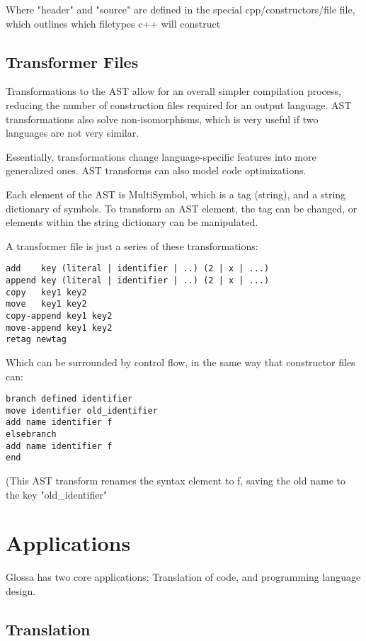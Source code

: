 \documentclass{article}
\begin{document}
Where "header" and "source" are defined in the special cpp/constructors/file file, which outlines which filetypes c++ will construct

\subsection{Transformer Files}

Transformations to the AST allow for an overall simpler compilation process, reducing the number of construction files required for an output language. 
AST transformations also solve non-isomorphisms, which is very useful if two languages are not very similar.

Essentially, transformations change language-specific features into more generalized ones. 
AST transforms can also model code optimizations.

Each element of the AST is MultiSymbol, which is a tag (string), and a string dictionary of symbols.
To transform an AST element, the tag can be changed, or elements within the string dictionary can be manipulated.

A transformer file is just a series of these transformations:
\begin{verbatim}
add    key (literal | identifier | ..) (2 | x | ...)
append key (literal | identifier | ..) (2 | x | ...)
copy   key1 key2
move   key1 key2
copy-append key1 key2
move-append key1 key2
retag newtag
\end{verbatim}
Which can be surrounded by control flow, in the same way that constructor files can:
\begin{verbatim}
branch defined identifier 
move identifier old_identifier
add name identifier f
elsebranch
add name identifier f
end
\end{verbatim}
(This AST transform renames the syntax element to f, saving the old name to the key "old\_identifier"

\section{Applications}

Glossa has two core applications: Translation of code, and programming language design.

\subsection{Translation}
\end{document}
